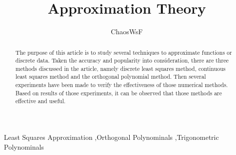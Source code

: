\documentclass[preprint,12pt]{elsarticle}
\begin{document}
\begin{frontmatter}


\title{Approximation Theory}




\author{ChaosWsF}

\address{No.*, X University}

\begin{abstract}
The purpose of this article is to study several techniques to approximate functions or discrete data. Taken the accuracy and popularity into consideration, there are three methods discussed in the article, namely discrete least squares method, continuous least squares method and the orthogonal polynomial method. Then several experiments have been made to verify the effectiveness of those numerical methods. Based on results of those experiments, it can be observed that those methods are effective and useful.
\end{abstract}

\begin{keyword}
Least Squares Approximation \sep Orthogonal Polynominals \sep Trigonometric Polynominals


\end{keyword}

\end{frontmatter}

\end{document}
